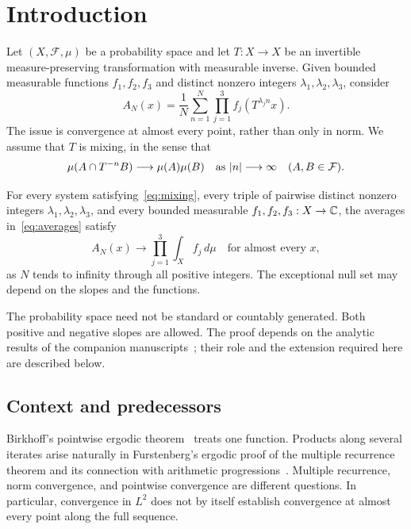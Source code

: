 \section{Introduction}\label{sec:introduction}

Let $(X,\mathcal F,\mu)$ be a probability space and let $T:X\to X$
be an invertible measure-preserving transformation with measurable
inverse. Given bounded measurable functions $f_1,f_2,f_3$ and distinct
nonzero integers $\lambda_1,\lambda_2,\lambda_3$, consider
\begin{equation}\label{eq:averages}
 A_N(x)=\frac1N\sum_{n=1}^N
       \prod_{j=1}^3 f_j(T^{\lambda_jn}x).
\end{equation}
The issue is convergence at almost every point, rather than only in
norm. We assume that $T$ is mixing, in the sense that
\begin{equation}\label{eq:mixing}
 \mu(A\cap T^{-n}B)\longrightarrow\mu(A)\mu(B)
 \quad\text{as }\lvert n\rvert\longrightarrow\infty
 \quad(A,B\in\mathcal F).
\end{equation}

\begin{theorem}\label{thm:main}
For every system satisfying~\eqref{eq:mixing}, every triple of pairwise
distinct nonzero integers $\lambda_1,\lambda_2,\lambda_3$, and every
bounded measurable $f_1,f_2,f_3:X\to\mathbb C$, the averages
in~\eqref{eq:averages} satisfy
\[
 A_N(x)\longrightarrow\prod_{j=1}^3\int_X f_j\,d\mu
 \quad\text{for almost every }x,
\]
as $N$ tends to infinity through all positive integers. The exceptional
null set may depend on the slopes and the functions.
\end{theorem}

The probability space need not be standard or countably generated.
Both positive and negative slopes are allowed. The proof depends on
the analytic results of the companion manuscripts~\cite{H,V}; their
role and the extension required here are described below.

\subsection{Context and predecessors}
Birkhoff's pointwise ergodic theorem~\cite{Birkhoff} treats one
function. Products along several iterates arise naturally in
Furstenberg's ergodic proof of the multiple recurrence theorem and its
connection with arithmetic progressions~\cite{Furstenberg}. Multiple
recurrence, norm convergence, and pointwise convergence are different
questions. In particular, convergence in $L^2$ does not by itself
establish convergence at almost every point along the full sequence.

